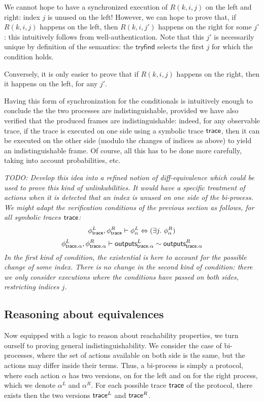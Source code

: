 We cannot hope to have a synchronized execution of $R(k,i,j)$ on the
left and right: index $j$ is unused on the left!
However, we can hope to prove that, if $R(k,i,j)$ happens on the left,
then $R(k,i,j')$ happens on the right for some $j'$: this intuitively
follows from well-authentication.
Note that this $j'$ is necessarily unique by definition of the semantics:
the $\mathsf{tryfind}$ selects the first $j$ for which the condition holds.

Conversely, it is only easier to prove that if $R(k,i,j)$ happens
on the right, then it happens on the left, for any $j'$.

Having this form of synchronization for the conditionals is intuitively
enough to conclude the the two processes are indistinguishable,
provided we have also verified that the produced frames are indistinguishable:
indeed, for any observable trace, if the trace is executed on one side
using a symbolic trace $\textsf{trace}$, then it can be executed on the other side
(modulo the changes of indices as above) to yield an indistinguishable
frame. Of course, all this has to be done more carefully, taking into
account probabilities, etc.

\emph{TODO: Develop this idea into a refined notion of diff-equivalence
which could be used to prove this kind of unlinkabilities. It would have
a specific treatment of actions when it is detected that an index is unused
on one side of the bi-process. We might adapt the verification conditions
of the previous section as follows, for all symbolic traces $\textsf{trace}$:}
$$ \phi^L_{\textsf{trace}}, \phi^R_{\textsf{trace}} \vdash
   \phi^L_\alpha \Leftrightarrow (\exists j.~ \phi^R_\alpha) $$
$$ \phi^L_{\textsf{trace}.\alpha}, \phi^R_{\textsf{trace}.\alpha} \vdash
   \textsf{outputs}_{\textsf{trace}.\alpha}^L \sim \textsf{outputs}_{\textsf{trace}.\alpha}^R $$
\emph{In the first kind of condition, the existential is here to account
for the possible change of some index. There is no change in the second
kind of condition: there we only consider executions where the conditions
have passed on both sides, restricting indices $j$.}

\subsection{Reasoning about equivalences}

Now equipped with a logic to reason about reachability properties, we turn
ourself to proving general indistinguishability. We consider the case of
bi-processes, where the set of actions available on both side is the same, but
the actions may differ inside their terms. Thus, a bi-process is simply a
protocol, where each action $\alpha$ has two versions, on for the left and on
for the right process, which we denote $\alpha^L$ and $\alpha^R$. For each
possible trace $\textsf{trace}$ of the protocol, there exists then the two versions
$\textsf{trace}^L$ and $\textsf{trace}^R$.

